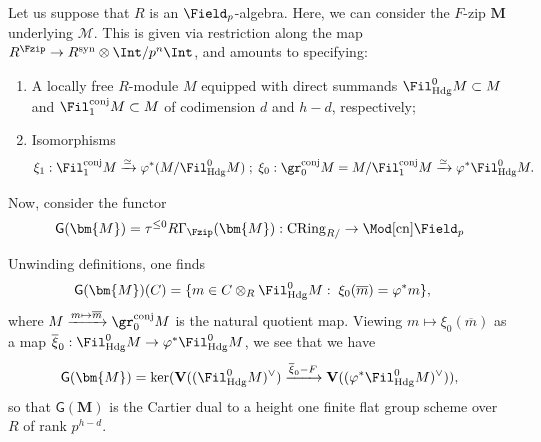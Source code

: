 \documentclass[10pt]{amsart}
\begin{document}
\subsubsection{}
\label{subsubsec:fzip_underlying_fgauge_h_d}
Let us suppose that $R$ is an $\Field_p$-algebra. Here, we can consider the $F$-zip $\bm{M}$ underlying $\mathcal{M}$. This is given via restriction along the map $R^{\Fzip}\to R^{\mathrm{syn}}\otimes\Int/p^n\Int$, and amounts to specifying:
\begin{enumerate}
   \item A locally free $R$-module $M$ equipped with direct summands $\Fil^0_{\mathrm{Hdg}}M\subset M$ and $\Fil_1^{\mathrm{conj}}M\subset M$ of codimension $d$ and $h-d$, respectively;
   \item Isomorphisms
   \[
\xi_1:\Fil_1^{\mathrm{conj}}M\xrightarrow{\simeq}\varphi^*(M/\Fil^0_{\mathrm{Hdg}}M)\;;\; \xi_0:\gr_0^{\mathrm{conj}}M = M/\Fil^{\mathrm{conj}}_1M\xrightarrow{\simeq}\varphi^*\Fil^0_{\mathrm{Hdg}}M.
\]
\end{enumerate}
Now, consider the functor 
\[
\mathsf{G}(\bm{M}) = \tau^{\leq 0}R\Gamma_{\Fzip}(\bm{M}):\mathrm{CRing}_{R/}\to \Mod[\mathrm{cn}]{\Field_p}
\]

Unwinding definitions, one finds
\begin{align*}
\mathsf{G}(\bm{M})(C) &=\{m\in C\otimes_R\Fil^0_{\mathrm{Hdg}}M:\;\xi_0(\overline{m}) = \varphi^*m \},
\end{align*}
where $M\xrightarrow{m\mapsto \overline{m}}\gr^{\mathrm{conj}}_0M$ is the natural quotient map. Viewing $m\mapsto \xi_0(\overline{m})$ as a map $\overline{\xi}_0:\Fil^0_{\mathrm{Hdg}}M\to \varphi^*\Fil^0_{\mathrm{Hdg}}M$, we see that we have
\[
\mathsf{G}(\bm{M}) = \ker(\mathbf{V}((\Fil^0_{\mathrm{Hdg}}M)^\vee)\xrightarrow{\overline{\xi}_0-F}\mathbf{V}((\varphi^*\Fil^0_{\mathrm{Hdg}}M)^\vee)),
\]
so that $\mathsf{G}(\bm{M}) $ is the Cartier dual to a height one finite flat group scheme over $R$ of rank $p^{h-d}$.
\end{document}
